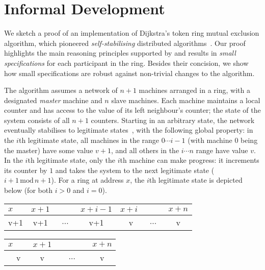\section{Informal Development}
\label{sec:intuition}

We sketch a proof of an implementation of Dijkstra's token ring mutual
exclusion algorithm, which pioneered \emph{self-stabilising}
distributed algorithms~\cite{dijkstra74}. Our proof highlights the main
reasoning principles supported by \colosl and results in \emph{small
  specifications} for each participant in the ring. Besides their
concision, we show how small specifications are robust against
non-trivial changes to the algorithm.

The algorithm %
assumes a network of $n{+}1$ machines arranged in a ring, with a
designated \emph{master} machine and $n$ slave machines. Each machine maintains a local counter and has
access to the value of its left neighbour's counter; the state of the
system consists of all $n{+}1$ counters. Starting in an arbitrary state,
the network eventually stabilises to legitimate
states~\cite{dijkstra-proof}, with the following global property: 
in the $i$th legitimate state, all machines in the range $0\cdots i{-}1$ (with machine $0$ being the master) have some value $v{+}1$, and all others in the $i \cdots n$ range have value $v$.  In the $i$th legitimate state, only the $i$th machine can make progress: it increments its counter by $1$ and takes the system to the next legitimate state ($i{+}1 \,\text{mod}\, n{+}1$). For a ring at address $x$, the $i$th legitimate state is depicted below (for both $i>0$ and $i=0$).  \\ \null\hfill
  \begin{tabular}{lllllll}
    $x$&$x{+}1$&&$x{+}i{-}1$&$x{+}i$&&$x{+}n$
    \\
    \hline
    \multicolumn{1}{|c|}{v+1} &
    \multicolumn{1}{|c|}{v+1} &
    \multicolumn{1}{|c|}{~$\cdots$~} &
    \multicolumn{1}{|c|}{v+1} &
    \multicolumn{1}{|c|}{~~v~\raisebox{1ex}{$\bullet$}} &
    \multicolumn{1}{|c|}{~$\cdots$~} &
    \multicolumn{1}{|c|}{v}\\
    \hline
  \end{tabular}\hfill
  \begin{tabular}{lllllll}
    $x$&$x{+}1$&&&&&$x{+}n$\\
    \hline
    \multicolumn{1}{|c|}{~~v~\raisebox{1ex}{$\bullet$}} &
    \multicolumn{1}{|c|}{v} &
    \multicolumn{4}{|c|}{~$\cdots$~} &
    \multicolumn{1}{|c|}{v}\\
    \hline
  \end{tabular}
  \hfill\null\\


